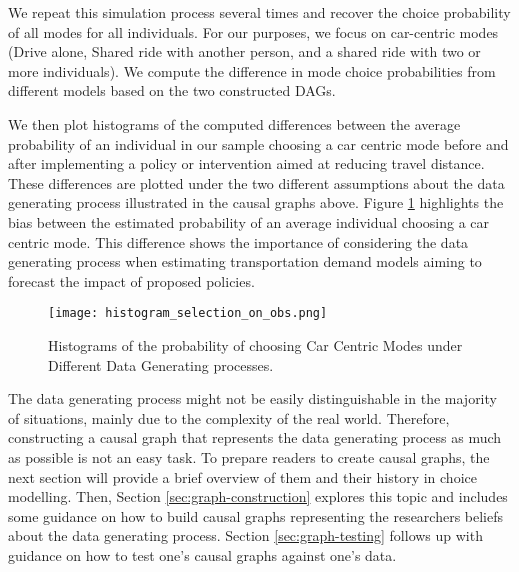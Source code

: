 We repeat this simulation process several times and recover the choice probability of all modes for all individuals.
For our purposes, we focus on car-centric modes (Drive alone, Shared ride with another person, 
and a shared ride with two or more individuals).
We compute the difference in mode choice probabilities from different models based on the two constructed DAGs.



We then plot histograms of the computed differences between the average probability of an individual
in our sample choosing a car centric mode before and after implementing a policy or intervention
aimed at reducing travel distance.
These differences are plotted under the two different assumptions about the data generating process illustrated in the causal graphs above.
Figure \ref{fig:histogram_probability} highlights the bias between the estimated probability of an average individual choosing a car centric mode.
This difference shows the importance of considering the data generating process when estimating transportation demand models aiming to forecast the impact of proposed policies.

\begin{figure}
   \centering
   \texttt{[image: histogram\_selection\_on\_obs.png]}
   \caption{Histograms of the probability of choosing Car Centric Modes under Different Data Generating processes.}
   \label{fig:histogram_probability}
\end{figure}

The data generating process might not be easily distinguishable in the majority of situations, mainly due to the complexity of the real world.
Therefore, constructing a causal graph that represents the data generating process as much as possible is not an easy task.
To prepare readers to create causal graphs, the next section will provide a brief overview of them and their history in choice modelling.
Then, Section \ref{sec:graph-construction} explores this topic and includes some guidance on how to build causal graphs representing the researchers beliefs about the data generating process.
Section \ref{sec:graph-testing} follows up with guidance on how to test one's causal graphs against one's data.
